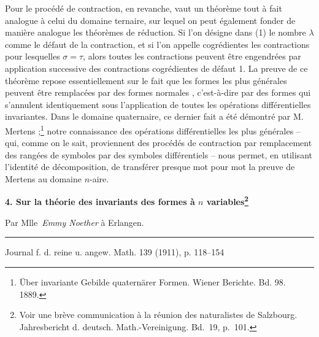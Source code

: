 \documentclass[11pt]{article}
\begin{document}
Pour le procédé de contraction, en revanche, vaut un théorème tout à fait analogue à celui du domaine ternaire, sur lequel on peut également fonder de manière analogue les théorèmes de réduction. Si l'on désigne dans (1) le nombre $\lambda$ comme le défaut de la contraction, et si l'on appelle cogrédientes les contractions pour lesquelles $\sigma=\tau$, alors toutes les contractions peuvent être engendrées par application successive des contractions cogrédientes de défaut 1. La preuve de ce théorème repose essentiellement sur le fait que les formes les plus générales peuvent être remplacées par des \og{} formes normales \fg{}, c'est-à-dire par des formes qui s'annulent identiquement sous l'application de toutes les opérations différentielles invariantes. Dans le domaine quaternaire, ce dernier fait a été démontré par M. Mertens ;\footnote{Über invariante Gebilde quaternärer Formen. Wiener Berichte. Bd. 98. 1889.} notre connaissance des opérations différentielles les plus générales -- qui, comme on le sait, proviennent des procédés de contraction par remplacement des rangées de symboles par des symboles différentiels -- nous permet, en utilisant l'identité de décomposition, de transférer presque mot pour mot la preuve de Mertens au domaine $n$-aire.

\clearpage
\setcounter{footnote}{0}

\begin{center}
{\Large\bfseries 4. Sur la théorie des invariants des formes à $n$ variables\footnote{Voir une brève communication à la réunion des naturalistes de Salzbourg. Jahresbericht d. deutsch. Math.-Vereinigung. Bd.\ 19, p.\ 101.}}\par
\vspace{0.5em}
Par Mlle\ \emph{Emmy Noether} à Erlangen.\par
\medskip
\rule{0.22\linewidth}{0.4pt}\par
\vspace{0.7em}
Journal f. d. reine u. angew. Math. 139 (1911), p. 118--154
\end{center}
\end{document}
